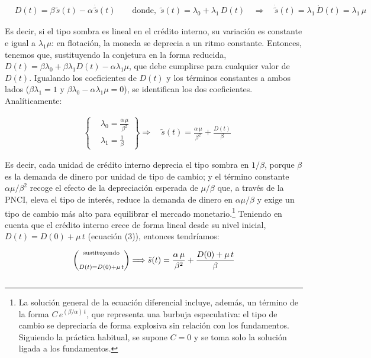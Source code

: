 \documentclass[10pt,a4paper]{article}
\begin{document}
$$\begin{aligned}
  &D(t)=\beta\,\tilde s(t)-\alpha \,\dot{\tilde s}(t)\qquad \text{donde,}\,\,\,\tilde s(t)=\lambda_0+\lambda_1\,D(t)\quad\Longrightarrow\quad\dot{\tilde s}(t)=\lambda_1\,\dot D(t)=\lambda_1\,\mu
\end{aligned}$$

Es decir, si el tipo sombra es lineal en el crédito interno, su variación es constante e igual a $\lambda_1\mu$: en flotación, la moneda se deprecia a un ritmo constante. Entonces, tenemos que, sustituyendo la conjetura en la forma reducida, $D(t)=\beta\lambda_0+\beta\lambda_1 D(t)-\alpha\lambda_1\mu$, que debe cumplirse para cualquier valor de $D(t)$. Igualando los coeficientes de $D(t)$ y los términos constantes a ambos lados ($\beta\lambda_1=1$ y $\beta\lambda_0-\alpha\lambda_1\mu=0$), se identifican los dos coeficientes. Analíticamente:

$$\begin{aligned}
  &\left\{\begin{aligned}
        &\lambda_0=\frac{\alpha\,\mu}{\beta^2}\\[0.5em]
        &\lambda_1=\frac{1}{\beta}
    \end{aligned}\right\}\Longrightarrow\quad \tilde s(t)=\frac{\alpha\,\mu}{\beta^2}+\frac{D(t)}{\beta}
\end{aligned}$$

Es decir, cada unidad de crédito interno deprecia el tipo sombra en $1/\beta$, porque $\beta$ es la demanda de dinero por unidad de tipo de cambio; y el término constante $\alpha\mu/\beta^2$ recoge el efecto de la depreciación esperada de $\mu/\beta$ que, a través de la PNCI, eleva el tipo de interés, reduce la demanda de dinero en $\alpha\mu/\beta$ y exige un tipo de cambio más alto para equilibrar el mercado monetario.\footnote{%
    La solución general de la ecuación diferencial incluye, además, un término de la forma $C\,e^{(\beta/\alpha)\,t}$, que representa una burbuja especulativa: el tipo de cambio se depreciaría de forma explosiva sin relación con los fundamentos. Siguiendo la práctica habitual, se supone $C=0$ y se toma solo la solución ligada a los fundamentos.
} Teniendo en cuenta que el crédito interno crece de forma lineal desde su nivel inicial, $D(t)=D(0)+\mu\,t$ (ecuación (3)), entonces tendríamos:

$$\begin{aligned}
  \left(\substack{\text{\scriptsize sustituyendo}\\[0.5em]\\ D(t)=D(0)+\mu\,t}\right)\Longrightarrow \tilde s(t)=\frac{\alpha\,\mu}{\beta^2}+\frac{D(0)+\mu\,t}{\beta}\\[1em]
\end{aligned}$$
\end{document}
